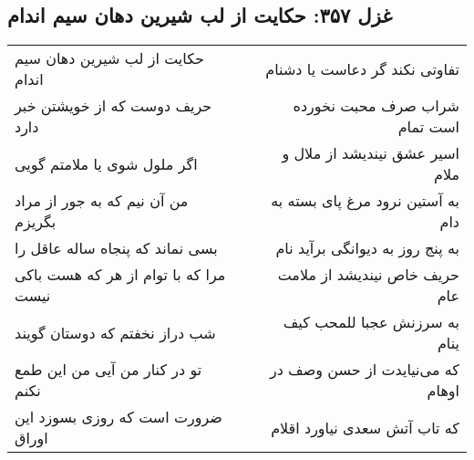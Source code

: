 \begin{center}
\section*{غزل ۳۵۷: حکایت از لب شیرین دهان سیم اندام}
\label{sec:357}
\begin{longtable}{l p{0.5cm} r}
حکایت از لب شیرین دهان سیم اندام
&&
تفاوتی نکند گر دعاست یا دشنام
\\
حریف دوست که از خویشتن خبر دارد
&&
شراب صرف محبت نخورده است تمام
\\
اگر ملول شوی یا ملامتم گویی
&&
اسیر عشق نیندیشد از ملال و ملام
\\
من آن نیم که به جور از مراد بگریزم
&&
به آستین نرود مرغ پای بسته به دام
\\
بسی نماند که پنجاه ساله عاقل را
&&
به پنج روز به دیوانگی برآید نام
\\
مرا که با توام از هر که هست باکی نیست
&&
حریف خاص نیندیشد از ملامت عام
\\
شب دراز نخفتم که دوستان گویند
&&
به سرزنش عجبا للمحب کیف ینام
\\
تو در کنار من آیی من این طمع نکنم
&&
که می‌نیایدت از حسن وصف در اوهام
\\
ضرورت است که روزی بسوزد این اوراق
&&
که تاب آتش سعدی نیاورد اقلام
\\
\end{longtable}
\end{center}
